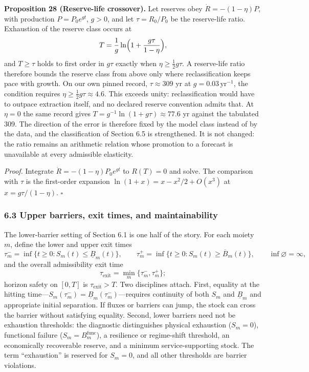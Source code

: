 \documentclass[11pt]{article}
\begin{document}
\textbf{Proposition 28 (Reserve-life crossover).} Let reserves obey \(\dot R=-(1-\eta)P\), with production \(P=P_0e^{gt}\), \(g>0\), and let \(\tau=R_0/\allowbreak{}P_0\) be the reserve-life ratio. Exhaustion of the reserve class occurs at \[ T=\frac1g\ln\Bigl(1+\frac{g\tau}{1-\eta}\Bigr), \] and \(T\ge\tau\) holds to first order in \(g\tau\) exactly when \(\eta\ge\tfrac12g\tau\). A reserve-life ratio therefore bounds the reserve class from above only where reclassification keeps pace with growth. On our own pinned record, \(\tau\approx309\) yr at \(g=0.03\,\mathrm{yr}^{-1}\), the condition requires \(\eta\ge\tfrac12g\tau\approx4.6\). This exceeds unity: reclassification would have to outpace extraction itself, and no declared reserve convention admits that. At \(\eta=0\) the same record gives \(T=g^{-1}\ln(1+g\tau)\approx77.6\) yr against the tabulated 309. The direction of the error is therefore fixed by the model class instead of by the data, and the classification of Section 6.5 is strengthened. It is not changed: the ratio remains an arithmetic relation whose promotion to a forecast is unavailable at every admissible elasticity.

\emph{Proof.} Integrate \(\dot R=-(1-\eta)P_0e^{gt}\) to \(R(T)=0\) and solve. The comparison with \(\tau\) is the first-order expansion \(\ln(1+x)=x-x^2/\allowbreak{}2+O(x^3)\) at \(x=g\tau/(1-\eta)\). \ensuremath{\square}


\subsubsection{6.3 Upper barriers, exit times, and
maintainability}\label{upper-barriers-exit-times-and-maintainability}

The lower-barrier setting of Section 6.1 is one half of the story. For each moiety \(m\), define the lower and upper exit times \[\tau_m^- = \inf\{ t \ge 0 : S_m(t) \le \underline{B}_m(t) \}, \qquad \tau_m^+ = \inf\{ t \ge 0 : S_m(t) \ge \overline{B}_m(t) \}, \qquad \inf\varnothing = \infty,\] and the overall admissibility exit time \[\tau_{\mathrm{exit}} = \min_m \{ \tau_m^-, \tau_m^+ \};\] horizon safety on \([0,T]\) is \(\tau_{\mathrm{exit}} > T\). Two disciplines attach. First, equality at the hitting time---\(S_m(\tau_m^-) = \underline{B}_m(\tau_m^-)\)---requires continuity of both \(S_m\) and \(\underline{B}_m\) and appropriate initial separation. If fluxes or barriers can jump, the stock can cross the barrier without satisfying equality. Second, lower barriers need not be exhaustion thresholds: the diagnostic distinguishes physical exhaustion (\(S_m = 0\)), functional failure (\(S_m = B_m^{\mathrm{func}}\)), a resilience or regime-shift threshold, an economically recoverable reserve, and a minimum service-supporting stock. The term ``exhaustion'' is reserved for \(S_m = 0\), and all other thresholds are barrier violations.
\end{document}
